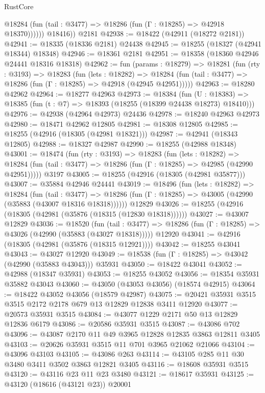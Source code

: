 \begin{lexlean}{RustCore}
\begin{coremodule}
              @18284 (fun (tail : @3477) => @18286 (fun (Γ : @18285) => @42918 @18370))))))
        @18416))
    @2181
@42938 := @18422 (@42911 (@18272 @2181))
@42941 := @18335 (@18336 @2181) @24438
@42945 := @18255 (@18327 (@42941 @18344) @18348)
@42946 := @18361 @2181
@42951 := @18358 (@18360 @42946 @24441 @18316 @18318)
@42962 := fun (params : @18279) =>
  @18281
    (fun (rty : @3193) =>
    @18283
      (fun (lets : @18282) =>
      @18284 (fun (tail : @3477) => @18286 (fun (Γ : @18285) => @42918 (@42945 @42951)))))
@42963 := @18280 @42962
@42964 := @18277 @42963
@42973 := @18384
    (fun (U : @18383) => @18385 (fun (t : @7) => @18393 (@18255 (@18399 @24438 @18273) @18410)))
@42976 := @42938 (@42964 @42973) @24436
@42978 := @18240 @42963 @42973
@42980 := @18471 @42962 @12805
@42981 := @18308 @12805
@42985 := @18255 (@42916 (@18305 (@42981 @18321)))
@42987 := @42941 (@18343 @12805)
@42988 := @18327 @42987
@42990 := @18255 (@42988 @18348)
@43001 := @18474
    (fun (rty : @3193) =>
    @18283
      (fun (lets : @18282) =>
      @18284 (fun (tail : @3477) => @18286 (fun (Γ : @18285) => @42985 (@42990 @42951)))))
    @3197
@43005 := @18255 (@42916 (@18305 (@42981 @35877)))
@43007 := @35884 @42946 @24441
@43019 := @18496
    (fun (lets : @18282) =>
    @18284
      (fun (tail : @3477) =>
      @18286 (fun (Γ : @18285) => @43005 (@42990 (@35883 (@43007 @18316 @18318))))))
    @12829
@43026 := @18255 (@42916 (@18305 (@42981 (@35876 (@18315 (@12830 @18318))))))
@43027 := @43007 @12829
@43036 := @18520
    (fun (tail : @3477) => @18286 (fun (Γ : @18285) => @43026 (@42990 (@35883 (@43027 @18318)))))
    @12920
@43041 := @42916 (@18305 (@42981 (@35876 (@18315 @12921))))
@43042 := @18255 @43041
@43043 := @43027 @12920
@43049 := @18538 (fun (Γ : @18285) => @43042 (@42990 (@35883 @43043))) @35931
@43050 := @18422 @43041
@43052 := @42988 (@18347 @35931)
@43053 := @18255 @43052
@43056 := @18354 @35931 @35882 @43043
@43060 := @43050 (@43053 @43056) (@18574 @42915)
@43064 := @18422 @43052 @43056 (@18579 @42987)
@43075 := @20421 @35931 @3515 @3515 @2172 @2178 @679 @13 @12829 @12838 @3411 @12920
@43077 := @20573 @35931 @3515
@43084 := @43077 @1229 @2171 @50 @13 @12829 @12836 @6179
@43086 := @20586 @35931 @3515
@43087 := @43086 @702
@43096 := @43087 @2170 @11 @49 @3965 @12828 @12835 @3863 @12811 @3405
@43103 := @20626 @35931 @3515 @11 @701 @3965 @21062 @21066
@43104 := @43096 @43103
@43105 := @43086 @263
@43114 := @43105 @285 @11 @30 @3480 @3411 @3502 @3863 @12821 @3405
@43116 := @18608 @35931 @3515
@43120 := @43116 @23 @11 @23 @3480
@43121 := @18617 @35931
@43125 := @43120 (@18616 (@43121 @23)) @20001

\end{coremodule}
\end{lexlean}
